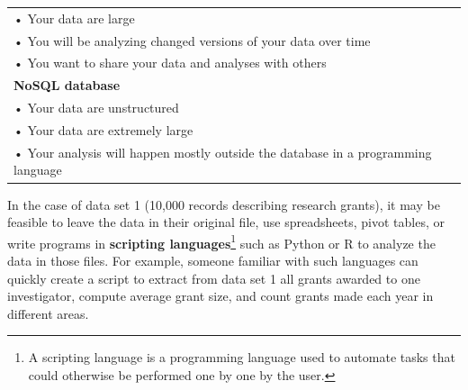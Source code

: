 \documentclass[]{krantz}
\begin{document}
\begin{longtable}[]{@{}l@{}}
\begin{minipage}[t]{0.89\columnwidth}\raggedright\strut
• Your data are large\strut
\end{minipage}\tabularnewline
\begin{minipage}[t]{0.89\columnwidth}\raggedright\strut
• You will be analyzing changed versions of your data over time\strut
\end{minipage}\tabularnewline
\begin{minipage}[t]{0.89\columnwidth}\raggedright\strut
• You want to share your data and analyses with others\strut
\end{minipage}\tabularnewline
\begin{minipage}[t]{0.89\columnwidth}\raggedright\strut
\textbf{NoSQL database}\strut
\end{minipage}\tabularnewline
\begin{minipage}[t]{0.89\columnwidth}\raggedright\strut
• Your data are unstructured\strut
\end{minipage}\tabularnewline
\begin{minipage}[t]{0.89\columnwidth}\raggedright\strut
• Your data are extremely large\strut
\end{minipage}\tabularnewline
\begin{minipage}[t]{0.89\columnwidth}\raggedright\strut
• Your analysis will happen mostly outside the database in a programming
language\strut
\end{minipage}\tabularnewline
\bottomrule
\end{longtable}

In the case of data set 1 (10,000 records describing research grants),
it may be feasible to leave the data in their original file, use
spreadsheets, pivot tables, or write programs in \textbf{scripting
languages}\footnote{A scripting language is a programming language used
  to automate tasks that could otherwise be performed one by one by the
  user.} such as Python or R to analyze the data in those files. For
example, someone familiar with such languages can quickly create a
script to extract from data set 1 all grants awarded to one
investigator, compute average grant size, and count grants made each
year in different areas.
\end{document}
